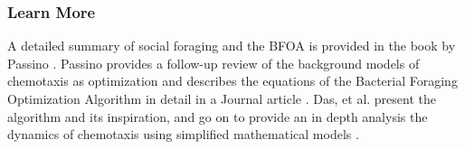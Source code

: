 % 
% 
\subsubsection{Learn More}
A detailed summary of social foraging and the BFOA is provided in the book by Passino \cite{Passino2005}.
Passino provides a follow-up review of the background models of chemotaxis as optimization and describes the equations of the  Bacterial Foraging Optimization Algorithm in detail in a Journal article \cite{Passino2010}.
Das, et al. present the algorithm and its inspiration, and go on to provide an in depth analysis the dynamics of chemotaxis using simplified mathematical models \cite{Das2009}.


